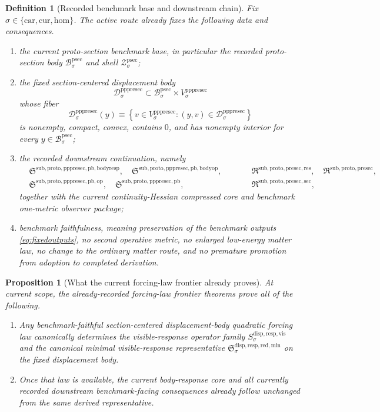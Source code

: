\documentclass[11pt]{article}
\newcommand{\Car}{\mathrm{car}}
\newcommand{\Cur}{\mathrm{cur}}
\newcommand{\Hom}{\mathrm{hom}}
\newcommand{\ProtoSectionBody}[1]{\mathcal B_{#1}^{\mathrm{psec}}}
\newcommand{\ProtoSectionShell}[1]{\mathcal Z_{#1}^{\mathrm{psec}}}
\newcommand{\PrePreProtoSectionVertical}[1]{V_{#1}^{\mathrm{pppresec}}}
\newcommand{\PrePreProtoSectionResidualBody}[1]{\mathcal D_{#1}^{\mathrm{pppresec}}}
\newcommand{\PullbackBodyResponseCore}{\mathfrak S^{\mathrm{sub,proto,pppresec,pb,bodyresp}}}
\newcommand{\PullbackBodyOperatorCore}{\mathfrak S^{\mathrm{sub,proto,pppresec,pb,bodyop}}}
\newcommand{\PullbackOperatorCore}{\mathfrak S^{\mathrm{sub,proto,pppresec,pb,op}}}
\newcommand{\PrePreProtoSectionPullbackCore}{\mathfrak S^{\mathrm{sub,proto,pppresec,pb}}}
\newcommand{\PreProtoSectionResidualPackage}{\mathfrak R^{\mathrm{sub,proto,presec,res}}}
\newcommand{\PreProtoSectionPackage}{\mathfrak R^{\mathrm{sub,proto,presec}}}
\newcommand{\PreProtoSectionMinSectionCore}{\mathfrak R^{\mathrm{sub,proto,presec,sec}}}
\newcommand{\VisibleResponseOperator}[1]{S_{#1}^{\mathrm{disp,resp,vis}}}
\newcommand{\MinimalReducedStructure}{\mathfrak S^{\mathrm{disp,resp,red,min}}}
\newtheorem{definition}{Definition}
\newtheorem{proposition}{Proposition}
\begin{document}
\begin{definition}[Recorded benchmark base and downstream chain]
\label{def:route}
Fix \(\sigma\in\{\Car,\Cur,\Hom\}\). The active route already fixes the following data and consequences.
\begin{enumerate}
    \item the current proto-section benchmark base, in particular the recorded proto-section body \(\ProtoSectionBody{\sigma}\) and shell \(\ProtoSectionShell{\sigma}\);
    \item the fixed section-centered displacement body
    \[
    \PrePreProtoSectionResidualBody{\sigma}
    \subset
    \ProtoSectionBody{\sigma}\times\PrePreProtoSectionVertical{\sigma}
    \]
    whose fiber
    \[
    \PrePreProtoSectionResidualBody{\sigma}(y)
    \equiv
    \left\{
    v\in\PrePreProtoSectionVertical{\sigma}:(y,v)\in\PrePreProtoSectionResidualBody{\sigma}
    \right\}
    \]
    is nonempty, compact, convex, contains \(0\), and has nonempty interior for every \(y\in\ProtoSectionBody{\sigma}\);
    \item the recorded downstream continuation, namely
    \[
    \begin{aligned}
    &\PullbackBodyResponseCore,\quad
    \PullbackBodyOperatorCore,\\
    &\PullbackOperatorCore,\quad
    \PrePreProtoSectionPullbackCore,
    \end{aligned}
    \qquad
    \begin{aligned}
    &\PreProtoSectionResidualPackage,\quad
    \PreProtoSectionPackage,\\
    &\PreProtoSectionMinSectionCore,
    \end{aligned}
    \]
    together with the current continuity-Hessian compressed core and benchmark one-metric observer package;
    \item benchmark faithfulness, meaning preservation of the benchmark outputs \eqref{eq:fixedoutputs}, no second operative metric, no enlarged low-energy matter law, no change to the ordinary matter route, and no premature promotion from adoption to completed derivation.
\end{enumerate}
\end{definition}

\begin{proposition}[What the current forcing-law frontier already proves]
\label{prop:frontier}
At current scope, the already-recorded forcing-law frontier theorems prove all of the following.
\begin{enumerate}
    \item Any benchmark-faithful section-centered displacement-body quadratic forcing law canonically determines the visible-response operator family \(\VisibleResponseOperator{\sigma}\) and the canonical minimal visible-response representative \(\MinimalReducedStructure_{\sigma}\) on the fixed displacement body.
    \item Once that law is available, the current body-response core and all currently recorded downstream benchmark-facing consequences already follow unchanged from the same derived representative.
\end{enumerate}
\end{proposition}
\end{document}

